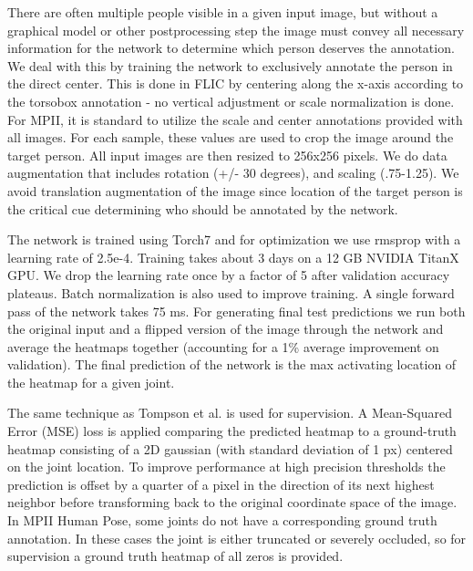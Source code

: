 \documentclass[runningheads]{llncs}
\begin{document}
There are often multiple people visible in a given input image, but
without a graphical model or other postprocessing step the image must
convey all necessary information for the network to determine which
person deserves the annotation. We deal with this by training the
network to exclusively annotate the person in the direct center. This
is done in FLIC by centering along the x-axis according to the
torsobox annotation - no vertical adjustment or scale normalization is
done. For MPII, it is standard to utilize the scale and center
annotations provided with all images. For each sample, these values
are used to crop the image around the target person. All input images
are then resized to 256x256 pixels. We do data augmentation that
includes rotation (+/- 30 degrees), and scaling (.75-1.25). We avoid
translation augmentation of the image since location of the target
person is the critical cue determining who should be annotated by the
network.

The network is trained using Torch7 \cite{torch7} and for optimization
we use rmsprop \cite{rmsprop} with a learning rate of 2.5e-4. Training
takes about 3 days on a 12 GB NVIDIA TitanX GPU. We drop the learning
rate once by a factor of 5 after validation accuracy plateaus. Batch
normalization \cite{ioffe2015batch} is also used to improve
training. A single forward pass of the network takes 75 ms. For
generating final test predictions we run both the original input
and a flipped version of the image through the network and average the
heatmaps together (accounting for a 1\% average improvement on
validation). The final prediction of the network is the max
activating location of the heatmap for a given joint.

The same technique as Tompson et al. \cite{tompson2014joint} is used
for supervision. A Mean-Squared Error (MSE) loss is applied comparing
the predicted heatmap to a ground-truth heatmap consisting of a 2D
gaussian (with standard deviation of 1 px) centered on the joint
location. To improve performance at high precision thresholds the
prediction is offset by a quarter of a pixel in the direction of its
next highest neighbor before transforming back to the original
coordinate space of the image. In MPII Human Pose, some joints do not
have a corresponding ground truth annotation. In these cases the joint
is either truncated or severely occluded, so for supervision a ground
truth heatmap of all zeros is provided.

\end{document}
